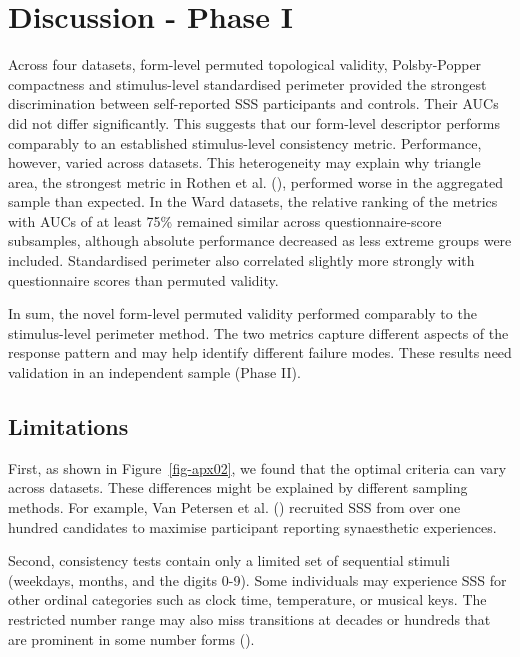 \documentclass[
  man,
  floatsintext,
  longtable,
  nolmodern,
  notxfonts,
  notimes,
  colorlinks=true,linkcolor=blue,citecolor=blue,urlcolor=blue]{apa7}
\begin{document}
\section{Discussion - Phase I}\label{discussion---phase-i}

Across four datasets, form-level permuted topological validity,
Polsby-Popper compactness and stimulus-level standardised perimeter
provided the strongest discrimination between self-reported SSS
participants and controls. Their AUCs did not differ significantly. This
suggests that our form-level descriptor performs comparably to an
established stimulus-level consistency metric. Performance, however,
varied across datasets. This heterogeneity may explain why triangle
area, the strongest metric in Rothen et al.
(), performed worse in the aggregated
sample than expected. In the Ward datasets, the relative ranking of the
metrics with AUCs of at least 75\% remained similar across
questionnaire-score subsamples, although absolute performance decreased
as less extreme groups were included. Standardised perimeter also
correlated slightly more strongly with questionnaire scores than
permuted validity.

In sum, the novel form-level permuted validity performed comparably to
the stimulus-level perimeter method. The two metrics capture different
aspects of the response pattern and may help identify different failure
modes. These results need validation in an independent sample (Phase
II).

\subsection{Limitations}\label{sec-limitations}

First, as shown in Figure~\ref{fig-apx02}, we found that the optimal
criteria can vary across datasets. These differences might be explained
by different sampling methods. For example, Van Petersen et al.
() recruited SSS from over one
hundred candidates to maximise participant reporting synaesthetic
experiences.

Second, consistency tests contain only a limited set of sequential
stimuli (weekdays, months, and the digits 0-9). Some individuals may
experience SSS for other ordinal categories such as clock time,
temperature, or musical keys. The restricted number range may also miss
transitions at decades or hundreds that are prominent in some number
forms ().
\end{document}
